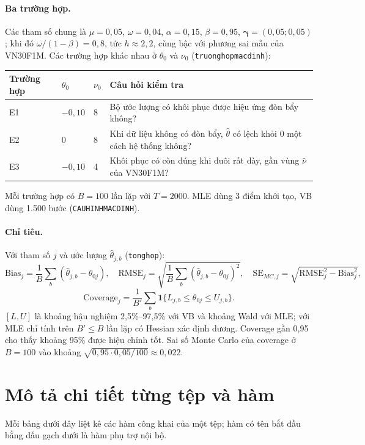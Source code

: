 \documentclass[11pt,a4paper]{article}
\renewcommand{\_}{\gachduoi\allowbreak}
\newcommand{\tep}[1]{\texttt{#1}}
\newcommand{\ham}[1]{\texttt{#1}}
\newcommand{\bgamma}{\boldsymbol\gamma}
\begin{document}
\paragraph{Ba trường hợp.} Các tham số chung là $\mu=0{,}05$, $\omega=0{,}04$, $\alpha=0{,}15$, $\beta=0{,}95$, $\bgamma=(0{,}05;0{,}05)$; khi đó $\omega/(1-\beta)=0{,}8$, tức $h\approx2{,}2$, cùng bậc với phương sai mẫu của VN30F1M. Các trường hợp khác nhau ở $\theta_0$ và $\nu_0$ (\ham{truong\_hop\_mac\_dinh}):
\begin{center}\small
\begin{tabular}{@{}llll@{}}
\toprule
\textbf{Trường hợp} & $\theta_0$ & $\nu_0$ & \textbf{Câu hỏi kiểm tra} \\
\midrule
E1 & $-0{,}10$ & 8 & Bộ ước lượng có khôi phục được hiệu ứng đòn bẩy không? \\
E2 & $0$ & 8 & Khi dữ liệu không có đòn bẩy, $\hat\theta$ có lệch khỏi 0 một cách hệ thống không? \\
E3 & $-0{,}10$ & 4 & Khôi phục có còn đúng khi đuôi rất dày, gần vùng $\hat\nu$ của VN30F1M? \\
\bottomrule
\end{tabular}
\end{center}
Mỗi trường hợp có $B=100$ lần lặp với $T=2000$. MLE dùng 3 điểm khởi tạo, VB dùng 1.500 bước (\tep{CAU\_HINH\_MAC\_DINH}).

\paragraph{Chỉ tiêu.} Với tham số $j$ và ước lượng $\hat\theta_{j,b}$ (\ham{tong\_hop}):
\begin{equation}
\mathrm{Bias}_j=\frac1B\sum_b(\hat\theta_{j,b}-\theta_{0j}),\quad
\mathrm{RMSE}_j=\sqrt{\frac1B\sum_b(\hat\theta_{j,b}-\theta_{0j})^2},\quad
\mathrm{SE}_{MC,j}=\sqrt{\mathrm{RMSE}_j^2-\mathrm{Bias}_j^2},
\end{equation}
\begin{equation}
\mathrm{Coverage}_j=\frac1{B'}\sum_{b}\mathbf 1\{L_{j,b}\le\theta_{0j}\le U_{j,b}\}.
\end{equation}
$[L,U]$ là khoảng hậu nghiệm 2,5\%--97,5\% với VB và khoảng Wald với MLE; với MLE chỉ tính trên $B'\le B$ lần lặp có Hessian xác định dương. Coverage gần 0,95 cho thấy khoảng 95\% được hiệu chỉnh tốt. Sai số Monte Carlo của coverage ở $B=100$ vào khoảng $\sqrt{0{,}95\cdot0{,}05/100}\approx0{,}022$.

\section{Mô tả chi tiết từng tệp và hàm}
Mỗi bảng dưới đây liệt kê các hàm công khai của một tệp; hàm có tên bắt đầu bằng dấu gạch dưới là hàm phụ trợ nội bộ.
\end{document}
